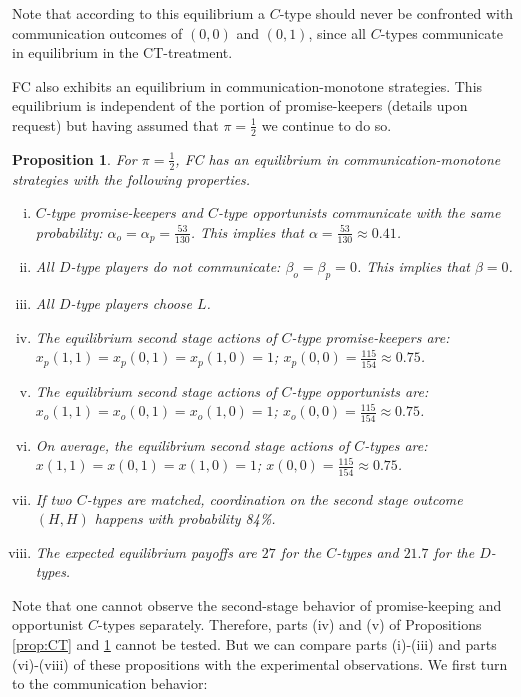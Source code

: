 \documentclass[12pt]{article}
\newtheorem{proposition}{Proposition} \theoremstyle{definition}
\theoremstyle{break}
\begin{document}
Note that according to this equilibrium a $C$-type should never be confronted with communication outcomes of $(0,0)$ and $(0,1)$, since all $C$-types communicate in equilibrium in the CT-treatment.

FC also exhibits an equilibrium in communication-monotone strategies. This equilibrium is independent of the portion of promise-keepers (details upon request) but having assumed that $\pi=\frac{1}{2}$ we continue to do so.

\begin{proposition}\label{prop:FC}
	For $\pi=\frac{1}{2}$, FC has an equilibrium in communication-monotone strategies with the following properties.
	\begin{enumerate}[i)]\setlength\itemsep{0em}
		\item $C$-type promise-keepers and $C$-type opportunists communicate with the same probability: $\alpha_o=\alpha_p=\frac{53}{130}$. This implies that $\alpha=\frac{53}{130}\approx 0.41$.
		\item All $D$-type players do not communicate: $\beta_o=\beta_p=0$. This implies that $\beta=0$.
		\item All $D$-type players choose $L$.
		\item The equilibrium second stage actions of $C$-type promise-keepers are:  $x_p(1,1)=x_p(0,1)=x_p(1,0)=1$; $x_p(0,0)=\frac{115}{154}\approx 0.75$.
		\item The equilibrium second stage actions of $C$-type opportunists are:  \\$x_o(1,1)=x_o(0,1)=x_o(1,0)=1$;  $x_o(0,0)=\frac{115}{154}\approx 0.75$.
		\item  On average, the equilibrium second stage actions of $C$-types are:  $x(1,1)=x(0,1)=x(1,0)=1$;  $x(0,0)=\frac{115}{154}\approx 0.75$.
		\item If two $C$-types are matched, coordination on the second stage outcome $(H,H)$ happens with probability 84\%.
		\item The expected equilibrium payoffs are $27$ for the $C$-types and $21.7$ for the $D$-types.
	\end{enumerate}
\end{proposition}
%
Note that one cannot observe the second-stage behavior of promise-keeping and opportunist $C$-types separately. Therefore, parts (iv) and (v) of Propositions \ref{prop:CT} and \ref{prop:FC} cannot be tested. But we can compare parts (i)-(iii) and parts (vi)-(viii) of these propositions with the experimental observations. We first turn to the communication behavior:
\end{document}
